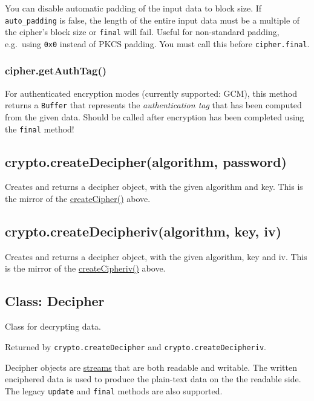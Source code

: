 You can disable automatic padding of the input data to block size. If
\texttt{auto\_padding} is false, the length of the entire input data
must be a multiple of the cipher's block size or \texttt{final} will
fail. Useful for non-standard padding, e.g.~using \texttt{0x0} instead
of PKCS padding. You must call this before \texttt{cipher.final}.

\subsubsection{cipher.getAuthTag()}\label{cipher.getauthtag}

For authenticated encryption modes (currently supported: GCM), this
method returns a \texttt{Buffer} that represents the
\emph{authentication tag} that has been computed from the given data.
Should be called after encryption has been completed using the
\texttt{final} method!

\subsection{crypto.createDecipher(algorithm,
password)}\label{crypto.createdecipheralgorithm-password}

Creates and returns a decipher object, with the given algorithm and key.
This is the mirror of the
\hyperref[cryptoux5fcryptoux5fcreatecipherux5falgorithmux5fpassword]{createCipher()}
above.

\subsection{crypto.createDecipheriv(algorithm, key,
iv)}\label{crypto.createdecipherivalgorithm-key-iv}

Creates and returns a decipher object, with the given algorithm, key and
iv. This is the mirror of the
\hyperref[cryptoux5fcryptoux5fcreatecipherivux5falgorithmux5fkeyux5fiv]{createCipheriv()}
above.

\subsection{Class: Decipher}\label{class-decipher}

Class for decrypting data.

Returned by \texttt{crypto.createDecipher} and
\texttt{crypto.createDecipheriv}.

Decipher objects are \href{stream.html}{streams} that are both readable
and writable. The written enciphered data is used to produce the
plain-text data on the the readable side. The legacy \texttt{update} and
\texttt{final} methods are also supported.

